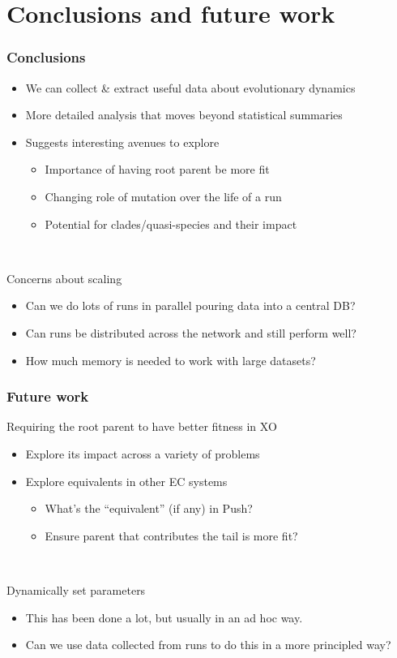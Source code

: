 \documentclass{beamer}
\begin{document}
\section{Conclusions and future work}

\begin{frame}
\frametitle{Conclusions}

\begin{itemize}
\item We can collect \& extract useful data about evolutionary dynamics
\item More detailed analysis that moves beyond statistical summaries
\item Suggests interesting avenues to explore
	\begin{itemize}
		\item Importance of having root parent be more fit
		\item Changing role of mutation over the life of a run
		\item Potential for clades/quasi-species and their impact
	\end{itemize}
\end{itemize}

~

Concerns about scaling
\begin{itemize}
	\item Can we do lots of runs in parallel pouring data into a central DB?
	\item Can runs be distributed across the network and still perform well?
	\item How much memory is needed to work with large datasets?
\end{itemize}

\end{frame}

\begin{frame}
\frametitle{Future work}

Requiring the root parent to have better fitness in XO
\begin{itemize}
	\item Explore its impact across a variety of problems
	\item Explore equivalents in other EC systems
	\begin{itemize}
		\item What's the ``equivalent'' (if any) in Push?
		\item Ensure parent that contributes the tail is more fit?
	\end{itemize}
\end{itemize}

~

Dynamically set parameters
\begin{itemize}
	\item This has been done a lot, but usually in an ad hoc way.
	\item Can we use data collected from runs to do this in a more principled way?
\end{itemize}
\end{frame}
\end{document}
